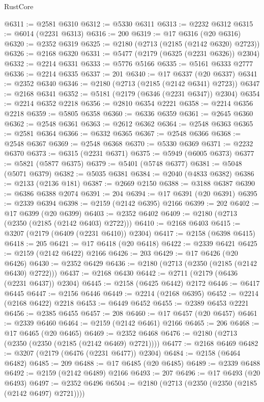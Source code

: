 \begin{lexlean}{RustCore}
\begin{coremodule}
@6311 := @2581 @6310
@6312 := @5330 @6311
@6313 := @2232 @6312
@6315 := @6014 (@2231 @6313)
@6316 := 200
@6319 := @17 @6316 (@20 @6316)
@6320 := @2352 @6319
@6325 := @2180 (@2713 (@2185 (@2142 @6320) @2723))
@6326 := @2168 @6320
@6331 := @5477 (@2179 (@6325 (@2231 @6326)) @2304)
@6332 := @2214 @6331
@6333 := @5776 @5166
@6335 := @5161 @6333 @2777
@6336 := @2214 @6335
@6337 := 201
@6340 := @17 @6337 (@20 @6337)
@6341 := @2352 @6340
@6346 := @2180 (@2713 (@2185 (@2142 @6341) @2723))
@6347 := @2168 @6341
@6352 := @5181 (@2179 (@6346 (@2231 @6347)) @2304)
@6354 := @2214 @6352 @2218
@6356 := @2810 @6354 @2221
@6358 := @2214 @6356 @2218
@6359 := @5805 @6358
@6360 := @6336 @6359
@6361 := @2645 @6360
@6362 := @2548 @6361
@6363 := @2612 @6362
@6364 := @2548 @6363
@6365 := @2581 @6364
@6366 := @6332 @6365
@6367 := @2548 @6366
@6368 := @2548 @6367
@6369 := @2548 @6368
@6370 := @5330 @6369
@6371 := @2232 @6370
@6373 := @6315 (@2231 @6371)
@6375 := @5949 (@6005 @6373)
@6377 := @5821 (@5877 @6375)
@6379 := @5401 (@5748 @6377)
@6381 := @5048 (@5071 @6379)
@6382 := @5035 @6381
@6384 := @2040 (@4833 @6382)
@6386 := @2133 (@2136 @181)
@6387 := @2669 @2150
@6388 := @3188 @6387
@6390 := @6386 @6388 @2074
@6391 := 204
@6394 := @17 @6391 (@20 @6391)
@6395 := @2339 @6394
@6398 := @2159 (@2142 @6395) @2166
@6399 := 202
@6402 := @17 @6399 (@20 @6399)
@6403 := @2352 @6402
@6409 := @2180 (@2713 (@2350 (@2185 (@2142 @6403) @2722)))
@6410 := @2168 @6403
@6415 := @3207 (@2179 (@6409 (@2231 @6410)) @2304)
@6417 := @2158 (@6398 @6415)
@6418 := 205
@6421 := @17 @6418 (@20 @6418)
@6422 := @2339 @6421
@6425 := @2159 (@2142 @6422) @2166
@6426 := 203
@6429 := @17 @6426 (@20 @6426)
@6430 := @2352 @6429
@6436 := @2180 (@2713 (@2350 (@2185 (@2142 @6430) @2722)))
@6437 := @2168 @6430
@6442 := @2711 (@2179 (@6436 (@2231 @6437)) @2304)
@6445 := @2158 (@6425 @6442) @2172
@6446 := @6417 @6445
@6447 := @2156 @6446
@6449 := @2214 (@2168 @6395)
@6452 := @2214 (@2168 @6422) @2218
@6453 := @6449 @6452
@6455 := @2389 @6453 @2221
@6456 := @2385 @6455
@6457 := 208
@6460 := @17 @6457 (@20 @6457)
@6461 := @2339 @6460
@6464 := @2159 (@2142 @6461) @2166
@6465 := 206
@6468 := @17 @6465 (@20 @6465)
@6469 := @2352 @6468
@6476 := @2180 (@2713 (@2350 (@2350 (@2185 (@2142 @6469) @2721))))
@6477 := @2168 @6469
@6482 := @3207 (@2179 (@6476 (@2231 @6477)) @2304)
@6484 := @2158 (@6464 @6482)
@6485 := 209
@6488 := @17 @6485 (@20 @6485)
@6489 := @2339 @6488
@6492 := @2159 (@2142 @6489) @2166
@6493 := 207
@6496 := @17 @6493 (@20 @6493)
@6497 := @2352 @6496
@6504 := @2180 (@2713 (@2350 (@2350 (@2185 (@2142 @6497) @2721))))

\end{coremodule}
\end{lexlean}
